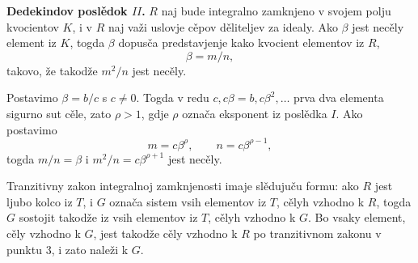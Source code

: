 \documentclass[11pt]{article}
\begin{document}
\medskip
\noindent\textbf{Dedekindov poslědok $II$.} $R$ naj bude integralno zamknjeno v svojem polju kvocientov $K$, i v $R$ naj važi uslovje cěpov děliteljev za idealy. Ako $\beta$ jest necěly element iz $K$, togda $\beta$ dopusča predstavjenje kako kvocient elementov iz $R$,
\[
        \beta=m/n,
\]
takovo, že takodže $m^2/n$ jest necěly.

Postavimo $\beta=b/c$ s $c\ne0$. Togda v redu $c,c\beta=b,c\beta^2,\ldots$ prva dva elementa sigurno sut cěle, zato $\rho>1$, gdje $\rho$ označa eksponent iz poslědka $I$. Ako postavimo
\[
        m=c\beta^\rho,\qquad n=c\beta^{\rho-1},
\]
togda $m/n=\beta$ i $m^2/n=c\beta^{\rho+1}$ jest necěly.

Tranzitivny zakon integralnoj zamknjenosti imaje slědujuču formu: ako $R$ jest ljubo kolco iz $T$, i $G$ označa sistem vsih elementov iz $T$, cělyh vzhodno k $R$, togda $G$ sostojit takodže iz vsih elementov iz $T$, cělyh vzhodno k $G$. Bo vsaky element, cěly vzhodno k $G$, jest takodže cěly vzhodno k $R$ po tranzitivnom zakonu v punktu 3, i zato naleži k $G$.
\end{document}

